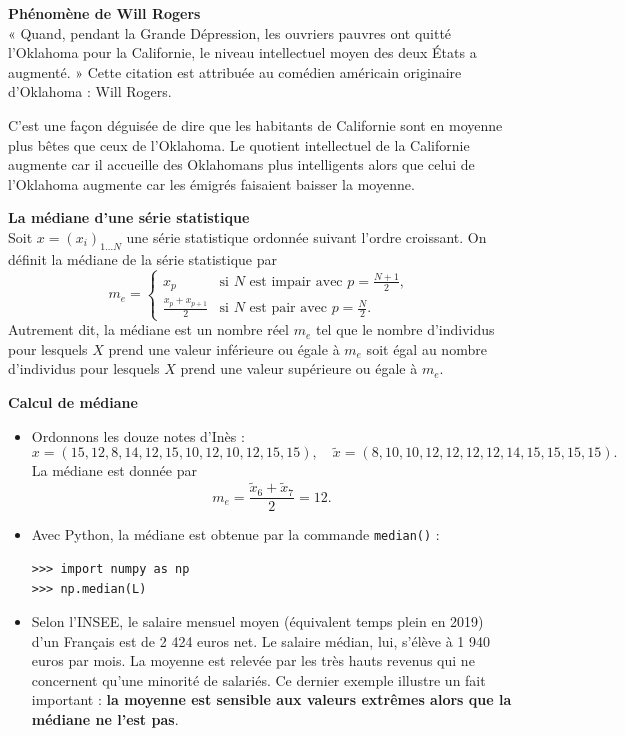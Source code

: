 \documentclass[../PolyS4.tex]{subfiles}
\begin{document}
\begin{Rmq}\textbf{Phénomène de Will Rogers}\\

« Quand, pendant la Grande Dépression, les ouvriers pauvres ont quitté l'Oklahoma pour la Californie, le niveau intellectuel moyen des deux États a augmenté. » Cette citation est attribuée au comédien américain originaire d'Oklahoma : Will Rogers.

C'est une façon déguisée de dire que les habitants de Californie sont en moyenne plus bêtes que ceux de l'Oklahoma. Le quotient intellectuel de la Californie augmente car il accueille des Oklahomans plus intelligents alors que celui de l'Oklahoma augmente car les émigrés faisaient baisser la moyenne.
\end{Rmq}

\begin{Def}\textbf{La médiane d'une série statistique}\\

Soit $x = (x_i)_{1 \ldots N}$ une série statistique ordonnée suivant l'ordre croissant. On définit la médiane de la série statistique par
\[
m_e =
\begin{cases}
x_p & \text{si } N \text{ est impair avec } p = \frac{N + 1}{2}, \\
\frac{x_p + x_{p+1}}{2} & \text{si } N \text{ est pair avec } p = \frac{N}{2}.
\end{cases}
\]
Autrement dit, la médiane est un nombre réel $m_e$ tel que le nombre d'individus pour lesquels $X$ prend une valeur inférieure ou égale à $m_e$ soit égal au nombre d'individus pour lesquels $X$ prend une valeur supérieure ou égale à $m_e$.
\end{Def}

\begin{Ex}\textbf{Calcul de médiane}\\

\begin{itemize}
    \item Ordonnons les douze notes d'Inès : 
    \[
    x = (15, 12, 8, 14, 12, 15, 10, 12, 10, 12, 15, 15), \quad \tilde{x} = (8, 10, 10, 12, 12, 12, 12, 14, 15, 15, 15, 15).
    \]
    La médiane est donnée par 
    \[
    m_e = \frac{\tilde{x}_6 + \tilde{x}_7}{2} = 12.
    \]
    
    \item Avec Python, la médiane est obtenue par la commande \texttt{median()} :
    \begin{verbatim}
>>> import numpy as np
>>> np.median(L)
    \end{verbatim}
    
    \item Selon l'INSEE, le salaire mensuel moyen (équivalent temps plein en 2019) d'un Français est de 2 424 euros net. Le salaire médian, lui, s'élève à 1 940 euros par mois. La moyenne est relevée par les très hauts revenus qui ne concernent qu'une minorité de salariés. Ce dernier exemple illustre un fait important : \textbf{la moyenne est sensible aux valeurs extrêmes alors que la médiane ne l'est pas}.
\end{itemize}
\end{Ex}
\end{document}

